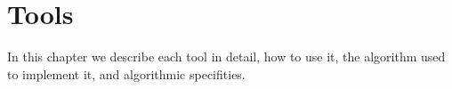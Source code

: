\chapter{Tools}

In this chapter we describe each tool in detail, how to use it, the
algorithm used to implement it, and algorithmic specifities.



































